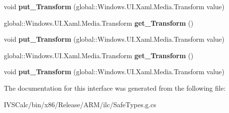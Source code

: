 \begin{DoxyCompactItemize}
void {\bfseries put\+\_\+\+Transform} (global\+::\+Windows.\+U\+I.\+Xaml.\+Media.\+Transform value)
\item 
\mbox{\label{interface_windows_1_1_u_i_1_1_xaml_1_1_media_1_1_i_geometry_a3c5b0dedb8823e2206458fd4b6b4106c}} 
global\+::\+Windows.\+U\+I.\+Xaml.\+Media.\+Transform {\bfseries get\+\_\+\+Transform} ()
\item 
\mbox{\label{interface_windows_1_1_u_i_1_1_xaml_1_1_media_1_1_i_geometry_a8e433ab6b71855a6e52aa253679badb2}} 
void {\bfseries put\+\_\+\+Transform} (global\+::\+Windows.\+U\+I.\+Xaml.\+Media.\+Transform value)
\item 
\mbox{\label{interface_windows_1_1_u_i_1_1_xaml_1_1_media_1_1_i_geometry_a3c5b0dedb8823e2206458fd4b6b4106c}} 
global\+::\+Windows.\+U\+I.\+Xaml.\+Media.\+Transform {\bfseries get\+\_\+\+Transform} ()
\item 
\mbox{\label{interface_windows_1_1_u_i_1_1_xaml_1_1_media_1_1_i_geometry_a8e433ab6b71855a6e52aa253679badb2}} 
void {\bfseries put\+\_\+\+Transform} (global\+::\+Windows.\+U\+I.\+Xaml.\+Media.\+Transform value)
\end{DoxyCompactItemize}


The documentation for this interface was generated from the following file\+:\begin{DoxyCompactItemize}
\item 
I\+V\+S\+Calc/bin/x86/\+Release/\+A\+R\+M/ilc/Safe\+Types.\+g.\+cs\end{DoxyCompactItemize}
